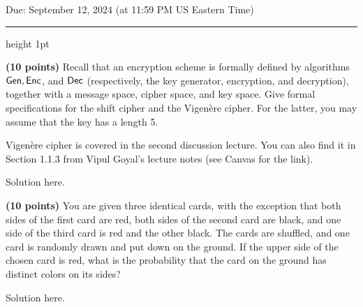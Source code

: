 \documentclass[12pt]{hw}
\begin{document}
\maketitle

\begin{center}
  Due: September 12, 2024 (at 11:59 PM US Eastern Time) \\[10pt]
  \hrule height 1pt
\end{center}


\begin{exercise}
  \textbf{(10 points)} Recall that an encryption scheme is formally
  defined by algorithms ${\sf Gen}, {\sf Enc}$, and ${\sf Dec}$
  (respectively, the key generator, encryption, and decryption),
  together with a message space, cipher space, and key space.  Give
  formal specifications for the shift cipher and the
  Vigen\`ere cipher. For the latter, you may assume that the key has a length 5.

  Vigen\`ere cipher is covered in the second discussion lecture. You can also find it in Section 1.1.3 from Vipul Goyal's lecture notes (see Canvas for the link). 
\end{exercise}

\begin{answer}
  Solution here.
\end{answer}


\begin{exercise}
  \textbf{(10 points)} 
You are given three identical cards, with the exception that both sides of the first card are
red, both sides of the second card are black, and one side of the third card is red and the
other black. The cards are shuffled, and one card is randomly drawn and put down on
the ground. If the upper side of the chosen card is red, what is the probability that the
card on the ground has distinct colors on its sides?
\end{exercise}

\begin{answer}
  Solution here.
\end{answer}

\end{document}
